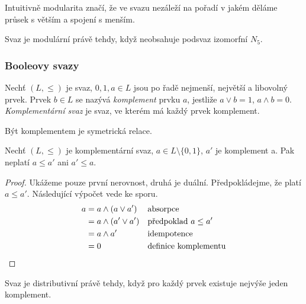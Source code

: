 Intuitivně modularita značí, že
ve svazu nezáleží na pořadí v jakém děláme průsek
s větším a spojení s menším.


\begin{claim}
    Svaz je modulární právě tehdy, když neobsahuje podsvaz izomorfní
    $N_5$.
\end{claim}

\subsubsection{Booleovy svazy}

\begin{definition}
Nechť $(L, \leq)$ je svaz, $0, 1, a \in L$ jsou po řadě nejmenší, největší a libovolný prvek.
Prvek $b \in L$ se nazývá {\em komplement} prvku $a$, jestliže
$a \vee b = 1$, $a \wedge b = 0$.
{\em Komplementární svaz} je svaz, ve kterém má každý prvek komplement.
\end{definition}

Být komplementem je symetrická relace.

\begin{claim}
    \label{complements_incomparable}
    Nechť $(L, \leq)$ je komplementární svaz, $a \in L \setminus
    \{0,1\}$, $a'$ je komplement a.
    Pak neplatí $a \leq a'$ ani $a' \leq a$.
\end{claim}
\begin{proof}
    Ukážeme pouze první nerovnost, druhá je duální.
    Předpokládejme, že platí $a \leq a'$. Následující výpočet vede ke
    sporu.
\begin{align*}
    a &= a \wedge (a \vee a')  && \text{absorpce}\\
      &= a \wedge (a' \vee a') && \text{předpoklad } a \leq a'\\
      &= a \wedge a' && \text{idempotence}\\
      &= 0 && \text{definice komplementu}
\qedhere
\end{align*}
\end{proof}

\begin{claim}
    Svaz je distributivní právě tehdy, když
    pro každý prvek existuje nejvýše jeden komplement.
\end{claim}

